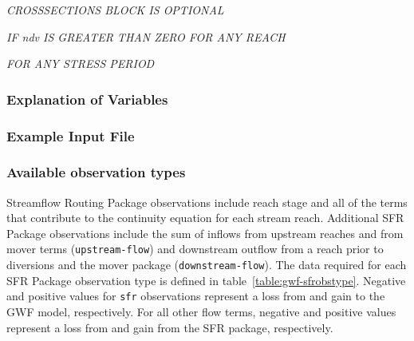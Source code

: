 \vspace{5mm}
\noindent \textit{CROSSSECTIONS BLOCK IS OPTIONAL}




\vspace{5mm}
\noindent \textit{IF ndv IS GREATER THAN ZERO FOR ANY REACH}


\vspace{5mm}
\noindent \textit{FOR ANY STRESS PERIOD}


\vspace{5mm}
\subsubsection{Explanation of Variables}
\begin{description}

\end{description}

\vspace{5mm}
\subsubsection{Example Input File}


\vspace{5mm}
\subsubsection{Available observation types}
Streamflow Routing Package observations include reach stage and all of the terms that contribute to the continuity equation for each stream reach. Additional SFR Package observations include the sum of inflows from upstream reaches and from mover terms (\texttt{upstream-flow}) and downstream outflow from a reach prior to diversions and the mover package (\texttt{downstream-flow}). The data required for each SFR Package observation type is defined in table~\ref{table:gwf-sfrobstype}. Negative and positive values for \texttt{sfr} observations represent a loss from and gain to the GWF model, respectively. For all other flow terms, negative and positive values represent a loss from and gain from the SFR package, respectively.

